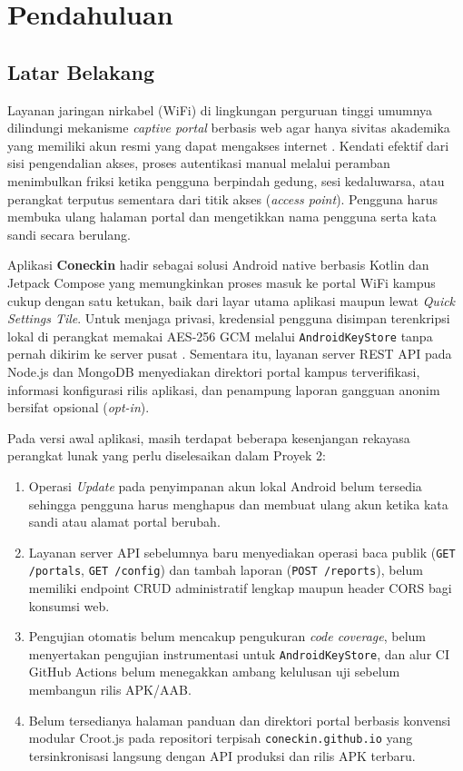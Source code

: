 \chapter{Pendahuluan}

\section{Latar Belakang}
Layanan jaringan nirkabel (WiFi) di lingkungan perguruan tinggi umumnya dilindungi mekanisme \textit{captive portal} berbasis web agar hanya sivitas akademika yang memiliki akun resmi yang dapat mengakses internet \cite{rfc8952}. Kendati efektif dari sisi pengendalian akses, proses autentikasi manual melalui peramban menimbulkan friksi ketika pengguna berpindah gedung, sesi kedaluwarsa, atau perangkat terputus sementara dari titik akses (\textit{access point}). Pengguna harus membuka ulang halaman portal dan mengetikkan nama pengguna serta kata sandi secara berulang.

Aplikasi \textbf{Coneckin} hadir sebagai solusi Android native berbasis Kotlin dan Jetpack Compose yang memungkinkan proses masuk ke portal WiFi kampus cukup dengan satu ketukan, baik dari layar utama aplikasi maupun lewat \textit{Quick Settings Tile}. Untuk menjaga privasi, kredensial pengguna disimpan terenkripsi lokal di perangkat memakai AES-256 GCM melalui \texttt{AndroidKeyStore} tanpa pernah dikirim ke server pusat \cite{android_keystore,nist_gcm}. Sementara itu, layanan server REST API pada Node.js dan MongoDB menyediakan direktori portal kampus terverifikasi, informasi konfigurasi rilis aplikasi, dan penampung laporan gangguan anonim bersifat opsional (\textit{opt-in}).

Pada versi awal aplikasi, masih terdapat beberapa kesenjangan rekayasa perangkat lunak yang perlu diselesaikan dalam Proyek 2:
\begin{enumerate}[leftmargin=*]
  \item Operasi \textit{Update} pada penyimpanan akun lokal Android belum tersedia sehingga pengguna harus menghapus dan membuat ulang akun ketika kata sandi atau alamat portal berubah.
  \item Layanan server API sebelumnya baru menyediakan operasi baca publik (\texttt{GET /portals}, \texttt{GET /config}) dan tambah laporan (\texttt{POST /reports}), belum memiliki endpoint CRUD administratif lengkap maupun header CORS bagi konsumsi web.
  \item Pengujian otomatis belum mencakup pengukuran \textit{code coverage}, belum menyertakan pengujian instrumentasi untuk \texttt{AndroidKeyStore}, dan alur CI GitHub Actions belum menegakkan ambang kelulusan uji sebelum membangun rilis APK/AAB.
  \item Belum tersedianya halaman panduan dan direktori portal berbasis konvensi modular Croot.js pada repositori terpisah \texttt{coneckin.github.io} yang tersinkronisasi langsung dengan API produksi dan rilis APK terbaru.
\end{enumerate}

